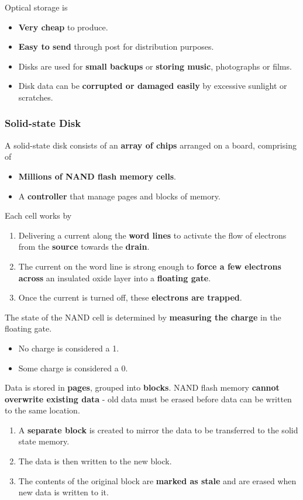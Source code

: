 Optical storage is
\begin{itemize}
    \item \textbf{Very cheap} to produce.
    \item \textbf{Easy to send} through post for distribution purposes.
    \item Disks are used for \textbf{small backups} or \textbf{storing music}, photographs or films.
    \item Disk data can be \textbf{corrupted or damaged easily} by excessive sunlight or scratches.
\end{itemize}

\subsubsection*{Solid-state Disk}

A solid-state disk consists of an \textbf{array of chips} arranged on a board, comprising of
\begin{itemize}
    \item \textbf{Millions of NAND flash memory cells}.
    \item A \textbf{controller} that manage pages and blocks of memory.
\end{itemize}

Each cell works by
\begin{enumerate}
    \item Delivering a current along the \textbf{word lines} to activate the flow of electrons from the \textbf{source} towards the \textbf{drain}.
    \item The current on the word line is strong enough to \textbf{force a few electrons across} an insulated oxide layer into a \textbf{floating gate}.
    \item Once the current is turned off, these \textbf{electrons are trapped}.
\end{enumerate}

The state of the NAND cell is determined by \textbf{measuring the charge} in the floating gate.
\begin{itemize}
    \item No charge is considered a 1.
    \item Some charge is considered a 0.
\end{itemize}

Data is stored in \textbf{pages}, grouped into \textbf{blocks}. NAND flash memory \textbf{cannot overwrite existing data} - old data must be erased before data can be written to the same location.
\begin{enumerate}
    \item A \textbf{separate block} is created to mirror the data to be transferred to the solid state memory.
    \item The data is then written to the new block.
    \item The contents of the original block are \textbf{marked as stale} and are erased when new data is written to it.
\end{enumerate}

